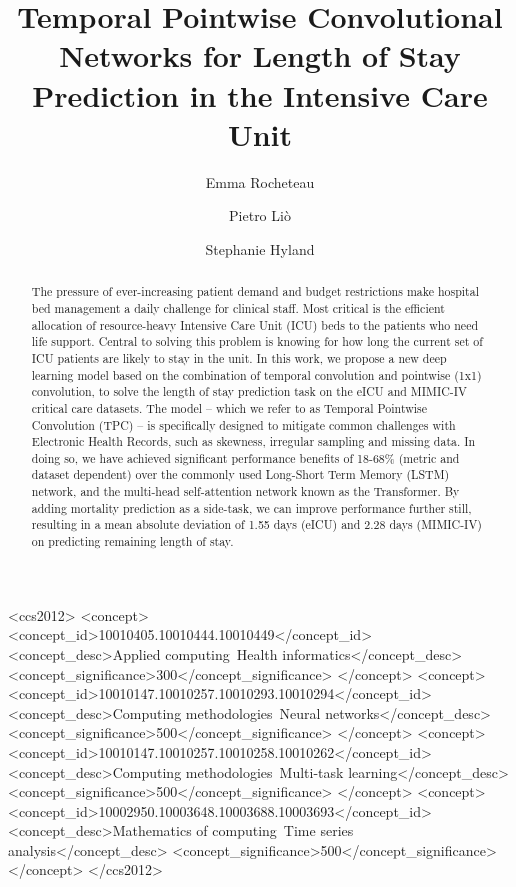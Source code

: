 \documentclass[sigconf]{acmart}
\begin{document}
\title[TPC Networks for LoS Prediction in the ICU]{Temporal Pointwise Convolutional Networks for Length of Stay Prediction in the Intensive Care Unit}

\author{Emma Rocheteau}

\author{Pietro Liò}

\author{Stephanie Hyland}

\begin{abstract}
    The pressure of ever-increasing patient demand and budget restrictions make hospital bed management a daily challenge for clinical staff. Most critical is the efficient allocation of resource-heavy Intensive Care Unit (ICU) beds to the patients who need life support. Central to solving this problem is knowing for how long the current set of ICU patients are likely to stay in the unit. In this work, we propose a new deep learning model based on the combination of temporal convolution and pointwise (1x1) convolution, to solve the length of stay prediction task on the eICU and MIMIC-IV critical care datasets. The model -- which we refer to as Temporal Pointwise Convolution (TPC) -- is specifically designed to mitigate common challenges with Electronic Health Records, such as skewness, irregular sampling and missing data. In doing so, we have achieved significant performance benefits of 18-68\% (metric and dataset dependent) over the commonly used Long-Short Term Memory (LSTM) network, and the multi-head self-attention network known as the Transformer. By adding mortality prediction as a side-task, we can improve performance further still, resulting in a mean absolute deviation of 1.55 days (eICU) and 2.28 days (MIMIC-IV) on predicting remaining length of stay.
\end{abstract}

\begin{CCSXML}
<ccs2012>
<concept>
<concept_id>10010405.10010444.10010449</concept_id>
<concept_desc>Applied computing~Health informatics</concept_desc>
<concept_significance>300</concept_significance>
</concept>
<concept>
<concept_id>10010147.10010257.10010293.10010294</concept_id>
<concept_desc>Computing methodologies~Neural networks</concept_desc>
<concept_significance>500</concept_significance>
</concept>
<concept>
<concept_id>10010147.10010257.10010258.10010262</concept_id>
<concept_desc>Computing methodologies~Multi-task learning</concept_desc>
<concept_significance>500</concept_significance>
</concept>
<concept>
<concept_id>10002950.10003648.10003688.10003693</concept_id>
<concept_desc>Mathematics of computing~Time series analysis</concept_desc>
<concept_significance>500</concept_significance>
</concept>
</ccs2012>
\end{CCSXML}
\end{document}
